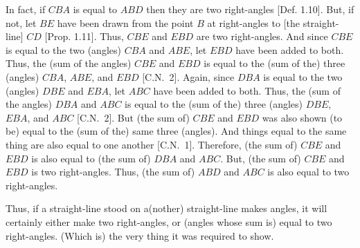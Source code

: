 \begin{Parallel}{}{}
{In fact, if $CBA$ is equal to $ABD$ then they are two right-angles [Def. 1.10].
But, if not, let $BE$ have been drawn from the point $B$ at right-angles to [the
straight-line] $CD$ [Prop. 1.11]. Thus, $CBE$ and $EBD$ are two right-angles.
And since $CBE$ is equal to the two (angles) $CBA$ and $ABE$, let $EBD$ have been added
to both. Thus, the (sum of the angles) $CBE$ and $EBD$ is equal to the  (sum of the) three (angles)
$CBA$, $ABE$, and $EBD$ [C.N.~2]. Again, since $DBA$ is equal to the two (angles) $DBE$
and $EBA$, let $ABC$ have been added to both. Thus, the (sum of the angles) $DBA$ and $ABC$ is
equal to the (sum of the) three (angles) $DBE$, $EBA$, and $ABC$ [C.N.~2]. But (the sum of) $CBE$ and $EBD$ was
also shown (to be) equal to the (sum of the) same three (angles). And things equal to the
same thing are also equal to one another [C.N.~1]. Therefore, 
(the sum of) $CBE$ and
$EBD$ is also equal to (the sum of) $DBA$ and $ABC$. But, (the sum of) $CBE$ and $EBD$ is two
right-angles. Thus, (the sum of) $ABD$ and $ABC$ is also equal to two right-angles.

Thus, if a straight-line stood on a(nother)  straight-line makes angles,
it will certainly either make two right-angles, or (angles whose sum is) equal
to two right-angles. (Which is) the very thing it was required to show.}
\end{Parallel}~\\

